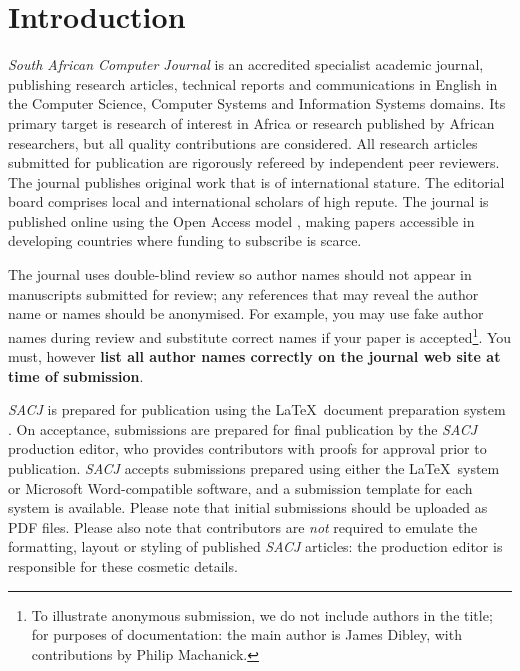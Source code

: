 \documentclass[submission]{sacjsub}
\begin{document}

\SACJmaketitle

\section{Introduction}
{\em South African Computer Journal} is an accredited specialist academic journal, publishing research articles, technical reports and communications in English in the Computer Science, Computer Systems and Information Systems domains. Its primary target is research of interest in Africa or research published by African researchers, but all quality contributions are considered. All research articles submitted for publication are rigorously refereed by independent peer reviewers. The journal publishes original work that is of international stature. The editorial board comprises local and international scholars of high repute. The journal is published online using the Open Access
model \cite{laakso2011development}, making papers accessible in developing countries where funding to subscribe is scarce.

The journal uses double-blind review so author names should not appear in manuscripts submitted for review; any references that may reveal the author name or names should be anonymised. For example, you may use fake author names during review and substitute correct names if your paper is accepted\footnote{To illustrate anonymous submission, we do not include authors in the title; for purposes of documentation: the main author is James Dibley, with contributions by Philip Machanick.}. You must, however \textbf{list all
author names correctly on the journal web site at time of submission}.

{\em SACJ} is prepared for publication using the \LaTeX~document preparation system \cite{kopka1995guide}. On acceptance, submissions are prepared for final publication by the {\em SACJ} production editor, who provides contributors with proofs for approval prior to publication. {\em SACJ} accepts submissions prepared using either the \LaTeX~system or Microsoft Word-compatible software, and a submission template for each system is available. Please note that initial submissions should be uploaded as PDF files. Please also note that contributors are \emph{not} required to emulate the formatting, layout or styling of published {\em SACJ} articles: the production editor is responsible for these cosmetic details.
\end{document}
